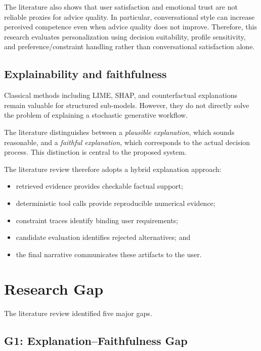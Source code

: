 \documentclass[12pt,a4paper]{article}
\begin{document}
The literature also shows that user satisfaction and emotional trust are not reliable proxies for advice quality. In particular, conversational style can increase perceived competence even when advice quality does not improve. Therefore, this research evaluates personalization using decision suitability, profile sensitivity, and preference/constraint handling rather than conversational satisfaction alone.

\subsection{Explainability and faithfulness}

Classical methods including LIME, SHAP, and counterfactual explanations remain valuable for structured sub-models. However, they do not directly solve the problem of explaining a stochastic generative workflow.

The literature distinguishes between a \textit{plausible explanation}, which sounds reasonable, and a \textit{faithful explanation}, which corresponds to the actual decision process. This distinction is central to the proposed system.

The literature review therefore adopts a hybrid explanation approach:
\begin{itemize}
    \item retrieved evidence provides checkable factual support;
    \item deterministic tool calls provide reproducible numerical evidence;
    \item constraint traces identify binding user requirements;
    \item candidate evaluation identifies rejected alternatives; and
    \item the final narrative communicates these artifacts to the user.
\end{itemize}

\section{Research Gap}

The literature review identified five major gaps.

\subsection{G1: Explanation--Faithfulness Gap}
\end{document}
